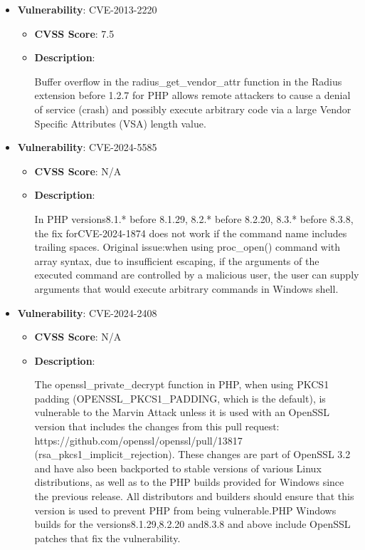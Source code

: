 \documentclass{article}
\begin{document}
\begin{itemize}
        \item \textbf{Vulnerability}: CVE-2013-2220
        \begin{itemize}
            \item \textbf{CVSS Score}:  7.5 
            \item \textbf{Description}:
            \parbox[t]{0.9\linewidth}{
                \ttfamily Buffer overflow in the radius\_get\_vendor\_attr function in the Radius extension before 1.2.7 for PHP allows remote attackers to cause a denial of service (crash) and possibly execute arbitrary code via a large Vendor Specific Attributes (VSA) length value.
            }
        \end{itemize}
    
        \item \textbf{Vulnerability}: CVE-2024-5585
        \begin{itemize}
            \item \textbf{CVSS Score}:  N/A 
            \item \textbf{Description}:
            \parbox[t]{0.9\linewidth}{
                \ttfamily In PHP versions8.1.* before 8.1.29, 8.2.* before 8.2.20, 8.3.* before 8.3.8, the fix forCVE-2024-1874 does not work if the command name includes trailing spaces. Original issue:when using proc\_open() command with array syntax, due to insufficient escaping, if the arguments of the executed command are controlled by a malicious user, the user can supply arguments that would execute arbitrary commands in Windows shell.
            }
        \end{itemize}
    
        \item \textbf{Vulnerability}: CVE-2024-2408
        \begin{itemize}
            \item \textbf{CVSS Score}:  N/A 
            \item \textbf{Description}:
            \parbox[t]{0.9\linewidth}{
                \ttfamily The openssl\_private\_decrypt function in PHP, when using PKCS1 padding (OPENSSL\_PKCS1\_PADDING, which is the default), is vulnerable to the Marvin Attack unless it is used with an OpenSSL version that includes the changes from this pull request:  https://github.com/openssl/openssl/pull/13817  (rsa\_pkcs1\_implicit\_rejection). These changes are part of OpenSSL 3.2 and have also been backported to stable versions of various Linux distributions, as well as to the PHP builds provided for Windows since the previous release. All distributors and builders should ensure that this version is used to prevent PHP from being vulnerable.PHP Windows builds for the versions8.1.29,8.2.20 and8.3.8 and above include OpenSSL patches that fix the vulnerability.
            }
        \end{itemize}
    

\end{itemize}
\end{document}
